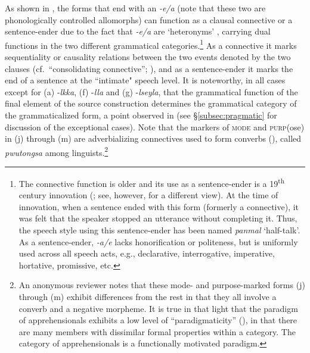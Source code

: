 \documentclass[output=paper,colorlinks,citecolor=brown]{langscibook}
\begin{document}
As shown in , the forms that end with an \textit{-e/a} (note that these two are phonologically controlled allomorphs) can function as a clausal connective or a sentence-ender due to the fact that \textit{-e/a} are `heteronyms' \citep{Lichtenberk1991}, carrying dual functions in the two different grammatical categories.\footnote{The connective function is older and its use as a sentence-ender is a 19\textsuperscript{th} century innovation (\citealt[139--141]{Suh1993}; see, however, \citealt{Park1996} for a different view). At the time of innovation, when a sentence ended with this form (formerly a connective), it was felt that the speaker stopped an utterance without completing it. Thus, the speech style using this sentence-ender has been named \textit{panmal} `half-talk'. As a sentence-ender, \textit{-a/e} lacks honorification or politeness, but is uniformly used across all speech acts, e.g., declarative, interrogative, imperative, hortative, promissive, etc.} As a connective it marks sequentiality or causality relations between the two events denoted by the two clauses (cf.\ ``consolidating connective''; \citealt{Koo1987}), and as a sentence-ender it marks the end of a sentence at the ``intimate" speech level. It is noteworthy, in all cases except for (a) \nobreakdash-\textit{lkka}, (f) \nobreakdash-\textit{lla} and (g) \nobreakdash-\textit{lseyla}, that the grammatical function of the final element of the source construction determines the grammatical category of the grammaticalized form, a point observed in \citet{Rhee2007} (see §\ref{subsec:pragmatic} for discussion of the exceptional cases). Note that the markers of \textsc{mode} and \textsc{purp}(ose) in (j) through (m) are adverbializing connectives used to form converbs (\citealt{Ramstedt1903,Ramstedt1997,Haspelmath1995}), called \textit{pwutongsa} among  linguists.\footnote{An anonymous reviewer notes that these mode- and purpose-marked forms (j) through (m) exhibit differences from the rest in that they all involve a converb and a negative morpheme. It is true in that light that the paradigm of  apprehensionals exhibits a low level of ``paradigmaticity'' (\citealt{Lehmann2015}), in that there are many members with dissimilar formal properties within a category. The category of apprehensionals is a functionally motivated paradigm.}  
\end{document}
